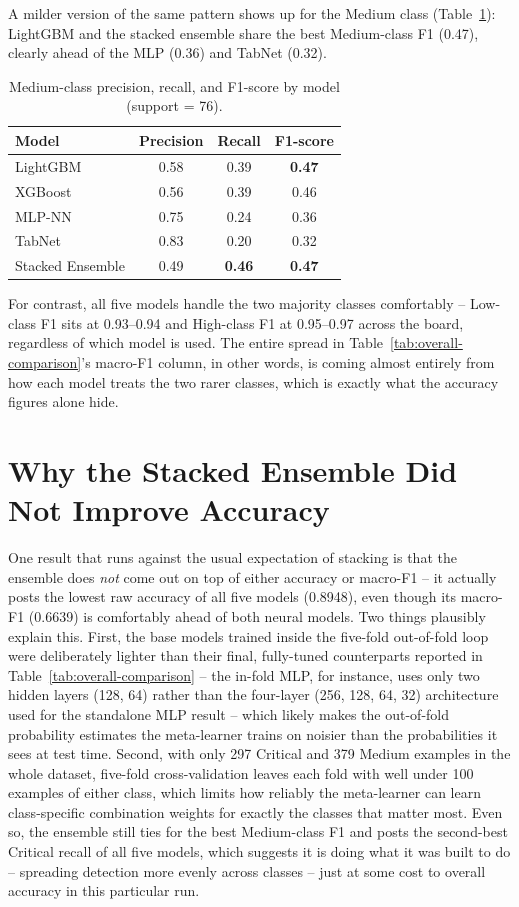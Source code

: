 A milder version of the same pattern shows up for the Medium class (Table~\ref{tab:medium-class}): LightGBM and the stacked ensemble share the best Medium-class F1 (0.47), clearly ahead of the MLP (0.36) and TabNet (0.32).

\begin{table}[!h]
\centering
\caption{Medium-class precision, recall, and F1-score by model (support = 76).}
\label{tab:medium-class}
\begin{tabular}{lccc}
\toprule
Model & Precision & Recall & F1-score \\
\midrule
LightGBM         & 0.58 & 0.39 & \textbf{0.47} \\
XGBoost          & 0.56 & 0.39 & 0.46 \\
MLP-NN           & 0.75 & 0.24 & 0.36 \\
TabNet           & 0.83 & 0.20 & 0.32 \\
Stacked Ensemble & 0.49 & \textbf{0.46} & \textbf{0.47} \\
\bottomrule
\end{tabular}
\end{table}

For contrast, all five models handle the two majority classes comfortably -- Low-class F1 sits at 0.93--0.94 and High-class F1 at 0.95--0.97 across the board, regardless of which model is used. The entire spread in Table~\ref{tab:overall-comparison}'s macro-F1 column, in other words, is coming almost entirely from how each model treats the two rarer classes, which is exactly what the accuracy figures alone hide.

\section{Why the Stacked Ensemble Did Not Improve Accuracy}

One result that runs against the usual expectation of stacking is that the ensemble does \emph{not} come out on top of either accuracy or macro-F1 -- it actually posts the lowest raw accuracy of all five models (0.8948), even though its macro-F1 (0.6639) is comfortably ahead of both neural models. Two things plausibly explain this. First, the base models trained inside the five-fold out-of-fold loop were deliberately lighter than their final, fully-tuned counterparts reported in Table~\ref{tab:overall-comparison} -- the in-fold MLP, for instance, uses only two hidden layers (128, 64) rather than the four-layer (256, 128, 64, 32) architecture used for the standalone MLP result -- which likely makes the out-of-fold probability estimates the meta-learner trains on noisier than the probabilities it sees at test time. Second, with only 297 Critical and 379 Medium examples in the whole dataset, five-fold cross-validation leaves each fold with well under 100 examples of either class, which limits how reliably the meta-learner can learn class-specific combination weights for exactly the classes that matter most. Even so, the ensemble still ties for the best Medium-class F1 and posts the second-best Critical recall of all five models, which suggests it is doing what it was built to do -- spreading detection more evenly across classes -- just at some cost to overall accuracy in this particular run.


